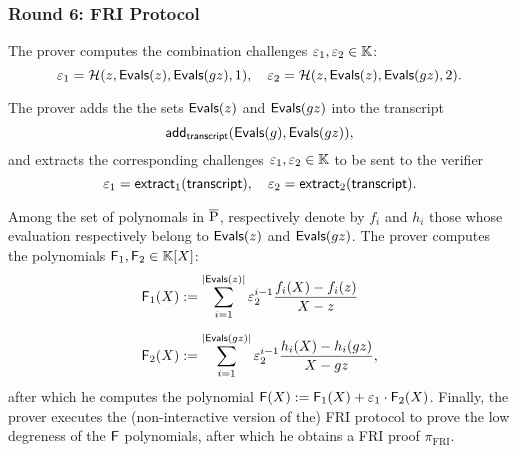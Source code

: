 

\subsubsection*{Round 6: FRI Protocol}

\ifNOPOLYGON
The prover computes the combination challenges $\varepsilon_1,\varepsilon_2 \in \mathbb{K}$:
\[
  \varepsilon_1 = \mathcal{H}(z,\textsf{Evals}(z),\textsf{Evals}(gz),1), \quad \varepsilon_2 = \mathcal{H}(z,\textsf{Evals}(z),\textsf{Evals}(gz),2).
\]
\fi

\ifPOLYGON
The prover adds the the sets $\textsf{Evals}(z)$ and $\textsf{Evals}(gz)$ into the transcript
\[
\textsf{add}_{\textsf{transcript}}(\textsf{Evals}(g), \textsf{Evals}(gz)),
\]
and extracts the corresponding challenges $\varepsilon_1, \varepsilon_2 \in \mathbb{K}$ to be sent to the verifier
\[
\varepsilon_1 = \mathsf{extract}_{1}(\textsf{transcript}), \quad \varepsilon_2 = \mathsf{extract}_{2}(\textsf{transcript}).
\]
\fi

  
Among the set of polynomals in $\overline{\text{P}}$, respectively denote by $f_i$ and $h_i$ those whose evaluation respectively belong to $\textsf{Evals}(z)$ and $\textsf{Evals}(gz)$. The prover computes the polynomials $\textsf{F}_1,\textsf{F}_2 \in \mathbb{K}[X]$:
\begin{align*}
  \textsf{F}_1(X) &:= \sum_{i = 1}^{|\textsf{Evals}(z)|} \varepsilon_2^{i-1} \frac{f_i(X) - f_i(z)}{X-z} \\[0.2cm]
  \textsf{F}_2(X) &:= \sum_{i = 1}^{|\textsf{Evals}(gz)|} \varepsilon_2^{i-1} \frac{h_i(X) - h_i(gz)}{X-gz},
\end{align*}
after which he computes the polynomial $\textsf{F}(X) := \textsf{F}_1(X) + \varepsilon_1 \cdot \textsf{F}_2(X)$. Finally, the prover executes the (non-interactive version of the) FRI protocol to prove the low degreness of the $\textsf{F}$ polynomials, after which he obtains a FRI proof $\pi_{\text{FRI}}$. 

